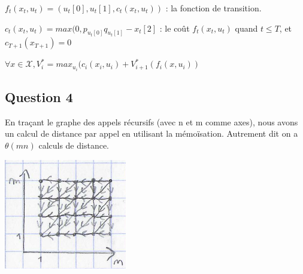 \documentclass[paper=a4, fontsize=11pt]{scrartcl} %
\begin{document}
$f_t(x_t, u_t) = (u_t[0], u_t[1], c_t(x_t, u_t)) $ : la fonction de transition.

$c_t(x_t, u_t) = max(0, p_{u_t[0]}q_{u_t[1]} - x_t[2]$ : le coût $f_t(x_t, u_t)$ quand $t \leq T$, et $c_{T+1}(x_{T+1}) = 0$

$\forall x \in \mathcal{X}, V_{i}^{*} = max_{u_i}(c_i(x_i, u_i) + V_{i+1}^*(f_i(x, u_i))$

\subsection*{Question 4}

En traçant le graphe des appels récursifs (avec n et m comme axes), nous avons un calcul de distance par appel en utilisant la mémoïsation.
Autrement dit on a $\theta(mn)$ calculs de distance.

\includegraphics[]{appels.pdf}
\end{document}
